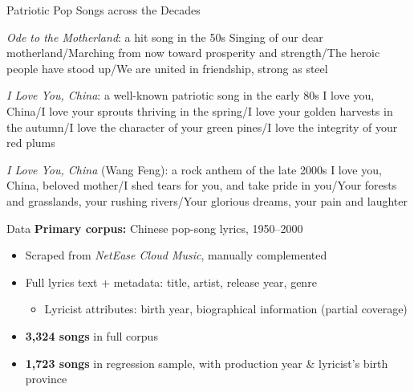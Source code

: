 \documentclass[aspectratio=169]{beamer}
\begin{document}
\begin{frame}{Patriotic Pop Songs across the Decades}
\small
\vspace{0.3em}
\footnotesize \begin{block}{\textit{Ode to the Motherland}: a hit song in the 50s}
    Singing of our dear motherland/Marching from now toward prosperity and strength/The heroic people have stood up/We are united in friendship, strong as steel
    \end{block}
    \begin{block}{\textit{I Love You, China}: a well-known patriotic song in the early 80s}
    I love you, China/I love your sprouts thriving in the spring/I love your golden harvests in the autumn/I love the character of your green pines/I love the integrity of your red plums
    \end{block}
    \begin{block}{\textit{I Love You, China} (Wang Feng): a rock anthem of the late 2000s}
    I love you, China, beloved mother/I shed tears for you, and take pride in you/Your forests and grasslands, your rushing rivers/Your glorious dreams, your pain and laughter
    \end{block}
\end{frame}

\begin{frame}{Data}
  \textbf{Primary corpus:} Chinese pop-song lyrics, 1950–2000
  \begin{itemize}
    \item Scraped from \textit{NetEase Cloud Music}, manually complemented
    \item Full lyrics text + metadata: title, artist, release year, genre
    \begin{itemize}
      \item Lyricist attributes: birth year, biographical information (partial coverage)
    \end{itemize}
    \item \textbf{3,324 songs} in full corpus
    \item \textbf{1,723 songs} in regression sample, with production year \& lyricist's birth province
  \end{itemize}

\end{frame}
\end{document}
